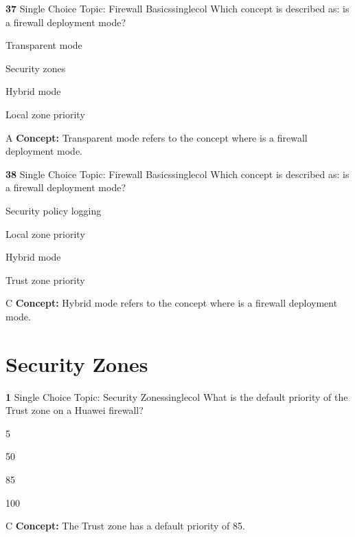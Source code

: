 \documentclass[10pt,a4paper]{article}
\begin{document}
\begin{qcard}{\color{white}\textbf{37} \hfill \small Single Choice \textbar{} Topic: Firewall Basics}{singlecol}
Which concept is described as: is a firewall deployment mode?

\begin{qoptions}
\item Transparent mode
\item Security zones
\item Hybrid mode
\item Local zone priority
\end{qoptions}
\begin{explainbox}{A}
\textbf{Concept:} Transparent mode refers to the concept where is a firewall deployment mode.
\end{explainbox}
\end{qcard}

\begin{qcard}{\color{white}\textbf{38} \hfill \small Single Choice \textbar{} Topic: Firewall Basics}{singlecol}
Which concept is described as: is a firewall deployment mode?

\begin{qoptions}
\item Security policy logging
\item Local zone priority
\item Hybrid mode
\item Trust zone priority
\end{qoptions}
\begin{explainbox}{C}
\textbf{Concept:} Hybrid mode refers to the concept where is a firewall deployment mode.
\end{explainbox}
\end{qcard}

\section{Security Zones}
\begin{qcard}{\color{white}\textbf{1} \hfill \small Single Choice \textbar{} Topic: Security Zones}{singlecol}
What is the default priority of the Trust zone on a Huawei firewall?

\begin{qoptions}
\item 5
\item 50
\item 85
\item 100
\end{qoptions}
\begin{explainbox}{C}
\textbf{Concept:} The Trust zone has a default priority of 85.
\end{explainbox}
\end{qcard}
\end{document}
